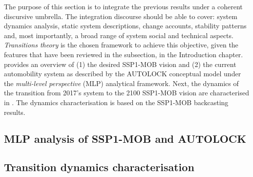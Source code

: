 %
%
%
The purpose of this section is to integrate the previous results under a coherent discursive umbrella. The integration discourse should be able to cover: system dynamics analysis, static system descriptions, change accounts, stability patterns and, most importantly, a broad range of system social and technical aspects. \emph{Transitions theory} is the chosen framework to achieve this objective, given the features that have been reviewed in the   subsection, in the Introduction chapter.  provides an overview of (1) the desired SSP1-MOB vision and (2) the current automobility system as described by the AUTOLOCK conceptual model under the \emph{multi-level perspective} (MLP) analytical framework. Next, the dynamics of the transition from 2017's system to the 2100 SSP1-MOB vision are characterised in . The dynamics characterisation is based on the SSP1-MOB backcasting results.

\subsection{MLP analysis of SSP1-MOB and AUTOLOCK}
\label{ss:results:transition_mlp}
%

\subsection{Transition dynamics characterisation}
\label{ss:results:transition_dynamics}
%

